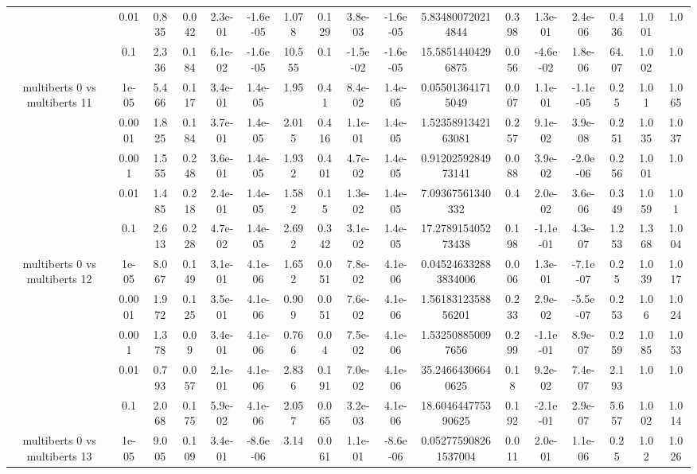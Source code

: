 \begin{tabular}{|c|c|c|c|c|c|c|c|c|c|c|c|c|c|c|c|c|}
 & 0.01 & 0.835 & 0.042 & 2.3e-01 & -1.6e-05 & 1.078 & 0.129 & 3.8e-03 & -1.6e-05 & 5.834800720214844 & 0.398 & 1.3e-01 & 2.4e-06 & 0.436 & 1.001 & 1.0 \\
 & 0.1 & 2.336 & 0.184 & 6.1e-02 & -1.6e-05 & 10.555 & 0.1 & -1.5e-02 & -1.6e-05 & 15.58514404296875 & 0.056 & -4.6e-02 & 1.8e-06 & 64.07 & 1.002 & 1.0 \\
\hline
\multirow{5}{*}{multiberts 0 vs multiberts 11} & 1e-05 & 5.466 & 0.117 & 3.4e-01 & 1.4e-05 & 1.95 & 0.41 & 8.4e-02 & 1.4e-05 & 0.055013641715049 & 0.007 & 1.1e-01 & -1.1e-05 & 0.25 & 1.01 & 1.065 \\
 & 0.0001 & 1.825 & 0.184 & 3.7e-01 & 1.4e-05 & 2.015 & 0.416 & 1.1e-01 & 1.4e-05 & 1.5235891342163081 & 0.257 & 9.1e-02 & 3.9e-08 & 0.251 & 1.035 & 1.037 \\
 & 0.001 & 1.555 & 0.248 & 3.6e-01 & 1.4e-05 & 1.932 & 0.401 & 4.7e-02 & 1.4e-05 & 0.9120259284973141 & 0.088 & 3.9e-02 & -2.0e-06 & 0.256 & 1.001 & 1.0 \\
 & 0.01 & 1.485 & 0.218 & 2.4e-01 & 1.4e-05 & 1.582 & 0.15 & 1.3e-02 & 1.4e-05 & 7.09367561340332 & 0.4 & 2.0e-02 & 3.6e-06 & 0.349 & 1.059 & 1.01 \\
 & 0.1 & 2.613 & 0.228 & 4.7e-02 & 1.4e-05 & 2.692 & 0.342 & 3.1e-02 & 1.4e-05 & 17.278915405273438 & 0.198 & -1.1e-01 & 4.3e-07 & 1.253 & 1.368 & 1.004 \\
\hline
\multirow{5}{*}{multiberts 0 vs multiberts 12} & 1e-05 & 8.067 & 0.149 & 3.1e-01 & 4.1e-06 & 1.652 & 0.051 & 7.8e-02 & 4.1e-06 & 0.045246332883834006 & 0.006 & 1.3e-01 & -7.1e-07 & 0.25 & 1.039 & 1.017 \\
 & 0.0001 & 1.972 & 0.125 & 3.5e-01 & 4.1e-06 & 0.909 & 0.051 & 7.6e-02 & 4.1e-06 & 1.5618312358856201 & 0.233 & 2.9e-02 & -5.5e-07 & 0.253 & 1.06 & 1.024 \\
 & 0.001 & 1.378 & 0.09 & 3.4e-01 & 4.1e-06 & 0.766 & 0.04 & 7.5e-02 & 4.1e-06 & 1.532508850097656 & 0.299 & -1.1e-01 & 8.9e-07 & 0.259 & 1.085 & 1.053 \\
 & 0.01 & 0.793 & 0.057 & 2.1e-01 & 4.1e-06 & 2.836 & 0.191 & 7.0e-02 & 4.1e-06 & 35.24664306640625 & 0.18 & 9.2e-02 & 7.4e-07 & 2.193 & 1.0 & 1.0 \\
 & 0.1 & 2.068 & 0.175 & 5.9e-02 & 4.1e-06 & 2.057 & 0.065 & 3.2e-03 & 4.1e-06 & 18.604644775390625 & 0.192 & -2.1e-01 & 2.9e-07 & 5.657 & 1.002 & 1.014 \\
\hline
\multirow{5}{*}{multiberts 0 vs multiberts 13} & 1e-05 & 9.005 & 0.109 & 3.4e-01 & -8.6e-06 & 3.14 & 0.061 & 1.1e-01 & -8.6e-06 & 0.052775908261537004 & 0.011 & 2.0e-01 & 1.1e-06 & 0.25 & 1.02 & 1.026 \\

\end{tabular}
